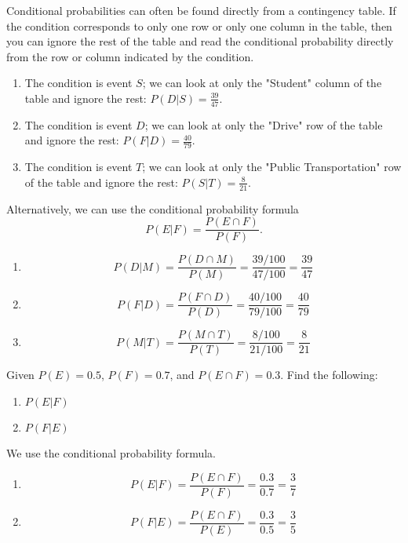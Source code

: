 \begin{solution}
    Conditional probabilities can often be found directly from a contingency table. If the condition corresponds to only one row or only one column in the table, then you can ignore the rest of the table and read the conditional probability directly from the row or column indicated by the condition.

    \begin{enumerate}
        \item The condition is event \(S\); we can look at only the "Student" column of the table and ignore the rest: \( P(D | S) = \frac{39}{47} \).
        \item The condition is event \(D\); we can look at only the "Drive" row of the table and ignore the rest: \( P(F | D) = \frac{40}{79}\).
        \item The condition is event \(T\); we can look at only the "Public Transportation" row of the table and ignore the rest: \( P(S | T) = \frac{8}{21} \).
    \end{enumerate}

    Alternatively, we can use the conditional probability formula \[P(E | F) = \frac{P(E \cap F)}{P(F)}.\]

    \begin{enumerate}
        \item \[P(D | M) = \frac{P(D \cap M)}{P(M)} = \frac{39/100}{47/100} = \frac{39}{47}\]
        \item \[P(F | D) = \frac{P(F \cap D)}{P(D)} = \frac{40/100}{79/100} = \frac{40}{79}\]
        \item \[P(M | T) = \frac{P(M \cap T)}{P(T)} = \frac{8/100}{21/100} = \frac{8}{21}\]
    \end{enumerate}
\end{solution}

\begin{example}
    Given \( P(E) = 0.5 \), \( P(F) = 0.7 \), and \( P(E \cap F) = 0.3 \). Find the following:
    \begin{enumerate}
        \item \( P(E | F) \)
        \item \( P(F | E) \)
    \end{enumerate}
\end{example}

\begin{solution}
    We use the conditional probability formula.
    \begin{enumerate}
        \item \[ P(E | F) = \frac{P(E \cap F)}{P(F)} = \frac{0.3}{0.7} = \frac{3}{7} \]
        \item \[ P(F | E) = \frac{P(E \cap F)}{P(E)} = \frac{0.3}{0.5} = \frac{3}{5} \]
    \end{enumerate}
\end{solution}

